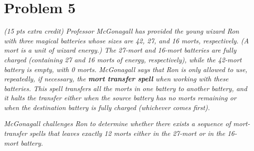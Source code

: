 \documentclass[12pt]{article} \setlength{\oddsidemargin}{0in}
\begin{document}
\newpage


\section*{Problem 5}

\textit{(15 pts extra credit) Professor McGonagall has provided the
  young wizard Ron with three magical batteries whose sizes are 42,
  27, and 16 morts, respectively. (A mort is a unit of wizard energy.)
  The 27-mort and 16-mort batteries are fully charged (containing 27
  and 16 morts of energy, respectively), while the 42-mort battery is
  empty, with 0 morts. McGonagall says that Ron is only allowed to
  use, repeatedly, if necessary, the \textbf{mort transfer spell} when
  working with these batteries. This spell transfers all the morts in
  one battery to another battery, and it halts the transfer either
  when the source battery has no morts remaining or when the
  destination battery is fully charged (whichever comes first).}

\textit{McGonagall challenges Ron to determine whether there exists a
  sequence of mort-transfer spells that leaves exactly 12 morts either
  in the 27-mort or in the 16-mort battery.}
\end{document}
